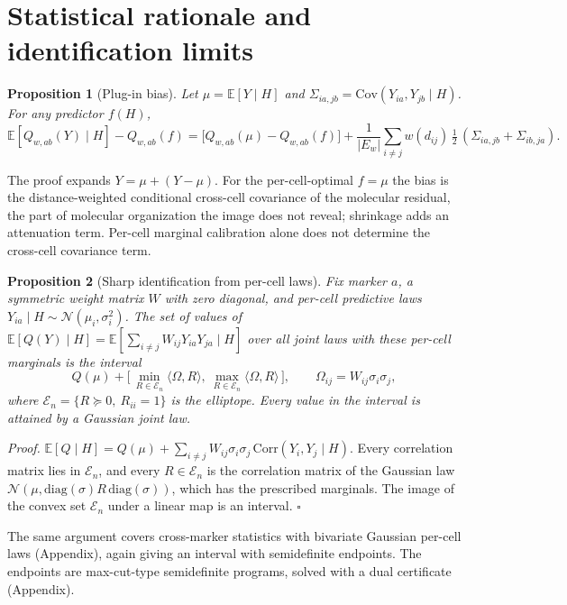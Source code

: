 \documentclass[10pt,letterpaper]{article}
\newtheorem{proposition}{Proposition}
\theoremstyle{definition}
\theoremstyle{remark}
\newcommand{\E}{\mathbb{E}}
\newcommand{\Cov}{\mathrm{Cov}}
\begin{document}
\section{Statistical rationale and identification limits}
\label{sec:theory}

\begin{proposition}[Plug-in bias]\label{prop:bias}
Let $\mu=\E[Y\mid H]$ and $\Sigma_{ia,jb}=\Cov(Y_{ia},Y_{jb}\mid H)$. For any predictor $f(H)$,
\[
\E[Q_{w,ab}(Y)\mid H]-Q_{w,ab}(f)=\big[Q_{w,ab}(\mu)-Q_{w,ab}(f)\big]+\frac{1}{|E_w|}\sum_{i\ne j}w(d_{ij})\,\tfrac12\,(\Sigma_{ia,jb}+\Sigma_{ib,ja}).
\]
\end{proposition}
The proof expands $Y=\mu+(Y-\mu)$. For the per-cell-optimal $f=\mu$ the bias is the distance-weighted conditional cross-cell covariance of the molecular residual, the part of molecular organization the image does not reveal; shrinkage adds an attenuation term. Per-cell marginal calibration alone does not determine the cross-cell covariance term.

\begin{proposition}[Sharp identification from per-cell laws]\label{prop:nonid}
Fix marker $a$, a symmetric weight matrix $W$ with zero diagonal, and per-cell predictive laws $Y_{ia}\mid H\sim\mathcal{N}(\mu_i,\sigma_i^2)$. The set of values of $\E[Q(Y)\mid H]=\E[\sum_{i\ne j}W_{ij}Y_{ia}Y_{ja}\mid H]$ over all joint laws with these per-cell marginals is the interval
\[
Q(\mu)+\big[\,\min_{R\in\mathcal{E}_n}\langle \Omega,R\rangle,\ \max_{R\in\mathcal{E}_n}\langle \Omega,R\rangle\,\big],\qquad \Omega_{ij}=W_{ij}\sigma_i\sigma_j,
\]
where $\mathcal{E}_n=\{R\succeq0,\ R_{ii}=1\}$ is the elliptope. Every value in the interval is attained by a Gaussian joint law.
\end{proposition}
\emph{Proof.} $\E[Q\mid H]=Q(\mu)+\sum_{i\ne j}W_{ij}\sigma_i\sigma_j\,\mathrm{Corr}(Y_i,Y_j\mid H)$. Every correlation matrix lies in $\mathcal{E}_n$, and every $R\in\mathcal{E}_n$ is the correlation matrix of the Gaussian law $\mathcal{N}(\mu,\mathrm{diag}(\sigma)R\,\mathrm{diag}(\sigma))$, which has the prescribed marginals. The image of the convex set $\mathcal{E}_n$ under a linear map is an interval. $\square$

The same argument covers cross-marker statistics with bivariate Gaussian per-cell laws (Appendix), again giving an interval with semidefinite endpoints. The endpoints are max-cut-type semidefinite programs, solved with a dual certificate (Appendix).
\end{document}
